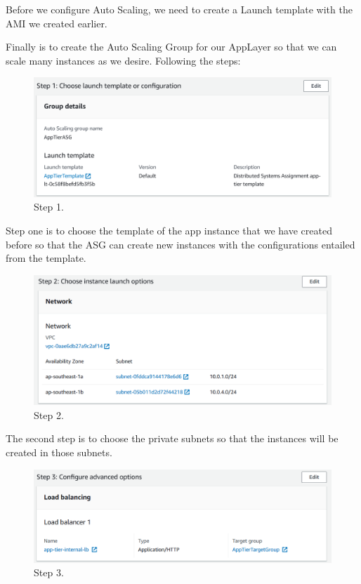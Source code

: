 \documentclass{article}
\begin{document}
Before we configure Auto Scaling, we need to create a Launch template with the AMI we created earlier.\par

Finally is to create the Auto Scaling Group for our AppLayer so that we can scale many instances as we desire. Following the steps:\par
\newpage
\begin{figure}[h]
    \centering
    \includegraphics[width=12cm]{Pictures/Internal LB/ASG_1.png}
    \caption{Step 1.}
    \label{fig:enter-label}
\end{figure}
Step one is to choose the template of the app instance that we have created before so that the ASG can create new instances with the configurations entailed from the template.\par

\begin{figure}[h]
    \centering
    \includegraphics[width=12cm]{Pictures/Internal LB/ASG_2.png}
    \caption{Step 2.}
    \label{fig:enter-label}
\end{figure}

The second step is to choose the private subnets so that the instances will be created in those subnets.\par

\begin{figure}[h]
    \centering
    \includegraphics[width=12cm]{Pictures/Internal LB/ASG_3.png}
    \caption{Step 3.}
    \label{fig:enter-label}
\end{figure}
\end{document}
